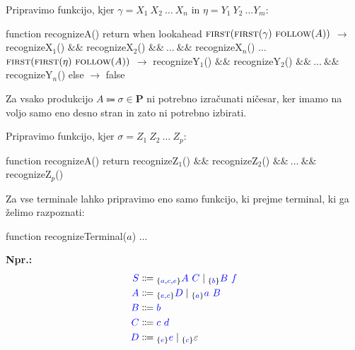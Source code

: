 \documentclass{article}
\newcommand{\Ex}{\textbf{Npr.:}\ }
\newcommand{\FIRST}{\textsc{first}}
\newcommand{\FOLLOW}{\textsc{follow}}
\newcommand{\Set}[1]{\mathbf{#1}}
\newcommand{\Symbol}[1]{\textcolor{blue}{#1}}
\newcommand{\Productions}{\Set{P}}
\newcommand{\Null}{\varepsilon}
\newcommand{\Arrow}{\Coloneq}
\newcommand{\Seq}{\ }
\newcommand{\Union}{\mathrel{|}}
\newcommand{\Lookahead}[1]{{}_{\{{#1}\}}}
\begin{document}
Pripravimo funkcijo, kjer $\gamma = X_1 \Seq X_2 \Seq \dots \Seq X_n$ in $\eta = Y_1 \Seq Y_2 \Seq \dots Y_m$:

\begin{algorithm}
  function recognizeA()
    return when lookahead
      $\FIRST(\FIRST(\gamma) \Seq \FOLLOW(A))$ $\rightarrow$ recognizeX$_1$() $\&\&$ recognizeX$_2$() $\&\&\ \dots\ \&\&$ recognizeX$_n$()
      $\dots$
      $\FIRST(\FIRST(\eta) \Seq \FOLLOW(A))$ $\rightarrow$ recognizeY$_1$() $\&\&$ recognizeY$_2$() $\&\&\ \dots\ \&\&$ recognizeY$_n$()
      else $\rightarrow$ false
\end{algorithm}

Za vsako produkcijo $A \Arrow \sigma \in \Productions$ ni potrebno izračunati ničesar, ker imamo na voljo samo eno desno stran in zato ni potrebno izbirati.

Pripravimo funkcijo, kjer $\sigma = Z_1 \Seq Z_2 \Seq \dots \Seq Z_p$:

\begin{algorithm}
  function recognizeA()
    return recognizeZ$_1$() $\&\&$ recognizeZ$_2$() $\&\&\ \dots\ \&\&$ recognizeZ$_p$()
\end{algorithm}

Za vse terminale lahko pripravimo eno samo funkcijo, ki prejme terminal, ki ga želimo razpoznati:
\begin{algorithm}
  function recognizeTerminal($a$)
    $\dots$
\end{algorithm}

\Ex
\begin{equation*}
  \begin{aligned}
    \Symbol{S} &\Arrow \Lookahead{\Symbol{a}, \Symbol{c}, \Symbol{e}} \Symbol{A} \Seq \Symbol{C} \Union \Lookahead{\Symbol{b}} \Symbol{B} \Seq \Symbol{f} \\
    \Symbol{A} &\Arrow \Lookahead{\Symbol{e}, \Symbol{c}} \Symbol{D} \Union \Lookahead{\Symbol{a}} \Symbol{a} \Seq \Symbol{B} \\
    \Symbol{B} &\Arrow \Symbol{b}\\
    \Symbol{C} &\Arrow \Symbol{c} \Seq \Symbol{d}\\
    \Symbol{D} &\Arrow \Lookahead{\Symbol{e}} \Symbol{e} \Union \Lookahead{\Symbol{c}} \Null
  \end{aligned}
\end{equation*}
\end{document}
